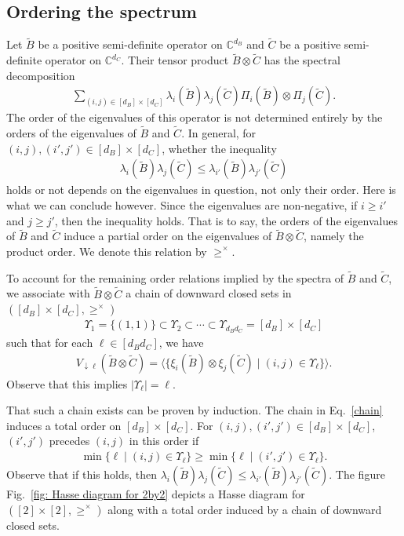\documentclass[12pt]{article}
\theoremstyle{definition}
\numberwithin{equation}{section}
\numberwithin{equation}{section}
\newcommand{\la}{\lambda}
\newcommand{\Ups}{\Upsilon}
\newcommand{\da}{\downarrow}
\newcommand{\bC}{\mathbb{C}}
\begin{document}
\subsection{Ordering the spectrum}
\label{subsec: order of spectrum of product} 
Let \(\tilde{B}\) be a positive semi-definite operator on \(\bC^{d_B}\) and \(\tilde{C}\) be a positive semi-definite operator on \(\bC^{d_C}\). Their tensor product \(\tilde{B} \otimes \tilde{C}\) has the spectral decomposition
\begin{gather}
\sum_{(i,j) \in [d_B] \times [d_C]} \la_i (\tilde{B}) \la_j (\tilde{C}) \Pi_i (\tilde{B}) \otimes \Pi_j (\tilde{C}).
\end{gather}
The order of the eigenvalues of this operator is not determined entirely by the orders of the eigenvalues of \(\tilde{B}\) and \(\tilde{C}\). In general, for \((i, j), (i', j') \in [d_B] \times [d_C]\), whether the inequality 
\begin{gather}
\la_i (\tilde{B}) \la_j (\tilde{C}) \leq \la_{i'} (\tilde{B}) \la_{j'} (\tilde{C})
\end{gather}
holds or not depends on the eigenvalues in question, not only their order. Here is what we can conclude however. Since the eigenvalues are non-negative, if \(i \geq i'\) and \(j \geq j'\), then the inequality holds. That is to say, the orders of the eigenvalues of \(\tilde{B}\) and \(\tilde{C}\) induce a partial order on the eigenvalues of \(\tilde{B} \otimes \tilde{C}\), namely the product order. We denote this relation by \(\geq^\times\). 



To account for the remaining order relations implied by the spectra of \(\tilde{B}\) and \(\tilde{C}\), we associate with \(\tilde{B} \otimes \tilde{C}\) a chain of downward closed sets in \(([d_B] \times [d_C], \geq^\times)\) 
\begin{align}
\label{chain}
\Ups_{1} = \{(1,1)\} \subset \Ups_{2} \subset \cdots \subset \Ups_{d_B d_C} = [d_B] \times [d_C]    
\end{align} 
such that for each \(\ell \in [d_B d_C]\), we have 
\begin{align}
\label{eq: downward closed projector}
V_{\da \ell} (\tilde{B} \otimes \tilde{C}) = \langle \{ \xi_i (\tilde{B}) \otimes \xi_j (\tilde{C}) \mid (i, j) \in \Ups_{\ell}\} \rangle.
\end{align}
Observe that this implies \(|\Ups_{\ell}| = \ell\).  


That such a chain exists can be proven by induction. The chain in Eq.~\ref{chain} induces a total order on \([d_B] \times [d_C]\). For \((i,j), (i', j') \in [d_B] \times [d_C]\), \((i',j')\) precedes \((i, j)\) in this order if 
\begin{align}
\min \{ \ell \mid (i, j) \in \Ups_\ell\} \geq \min \{ \ell \mid (i', j') \in \Ups_\ell\}.
\end{align}
Observe that if this holds, then \(\la_i (\tilde{B}) \la_j (\tilde{C}) \leq \la_{i'} (\tilde{B}) \la_{j'} (\tilde{C})\). The figure Fig.~\ref{fig: Hasse diagram for 2by2} depicts a Hasse diagram for \(([2] \times [2], \geq^\times)\) along with a total order induced by a chain of downward closed sets.
\end{document}

